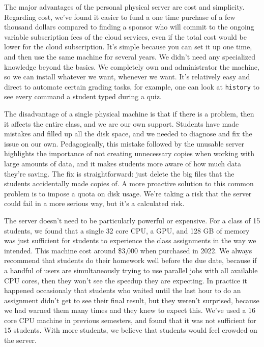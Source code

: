 \documentclass[12pt]{article}
\begin{document}
The major advantages of the personal physical server are cost and simplicity.
Regarding cost, we've found it easier to fund a one time purchase of a few thousand dollars compared to finding a sponsor who will commit to the ongoing variable subscription fees of the cloud services, even if the total cost would be lower for the cloud subscription.
It's simple because you can set it up one time, and then use the same machine for several years.
We didn't need any specialized knowledge beyond the basics.
We completely own and administrator the machine, so we can install whatever we want, whenever we want.
It's relatively easy and direct to automate certain grading tasks, for example, one can look at \texttt{history} to see every command a student typed during a quiz.

The disadvantage of a single physical machine is that if there is a problem, then it affects the entire class, and we are our own support.
Students have made mistakes and filled up all the disk space, and we needed to diagnose and fix the issue on our own.
Pedagogically, this mistake followed by the unusable server highlights the importance of not creating unnecessary copies when working with large amounts of data, and it makes students more aware of how much data they're saving.
The fix is straightforward: just delete the big files that the students accidentally made copies of.
A more proactive solution to this common problem is to impose a quota on disk usage.
We're taking a risk that the server could fail in a more serious way, but it's a calculated risk.


The server doesn't need to be particularly powerful or expensive.
For a class of 15 students, we found that a single 32 core CPU, a GPU, and 128 GB of memory was just sufficient for students to experience the class assignments in the way we intended.
This machine cost around \$3,000 when purchased in 2022.
We always recommend that students do their homework well before the due date, because if a handful of users are simultaneously trying to use parallel jobs with all available CPU cores, then they won't see the speedup they are expecting.
In practice it happened occasionaly that students who waited until the last hour to do an assignment didn't get to see their final result, but they weren't surprised, because we had warned them many times and they knew to expect this.
We've used a 16 core CPU machine in previous semesters, and found that it was not sufficient for 15 students.
With more students, we believe that students would feel crowded on the server.
\end{document}
